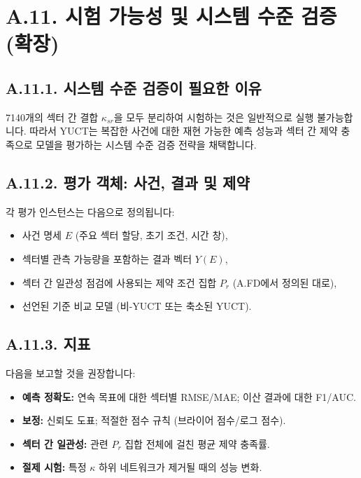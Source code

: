 \documentclass[13pt,a4paper]{article}
\begin{document}
	\section*{A.11. 시험 가능성 및 시스템 수준 검증 (확장)}
	\label{sec:extended-testability}
	
	\subsection*{A.11.1. 시스템 수준 검증이 필요한 이유}
	7140개의 섹터 간 결합 $\kappa_{sr}$을 모두 분리하여 시험하는 것은 일반적으로 실행 불가능합니다. 따라서 YUCT는 복잡한 사건에 대한 재현 가능한 예측 성능과 섹터 간 제약 충족으로 모델을 평가하는 시스템 수준 검증 전략을 채택합니다.
	
	\subsection*{A.11.2. 평가 객체: 사건, 결과 및 제약}
	각 평가 인스턴스는 다음으로 정의됩니다:
	\begin{itemize}[leftmargin=*]
		\item 사건 명세 $E$ (주요 섹터 할당, 초기 조건, 시간 창),
		\item 섹터별 관측 가능량을 포함하는 결과 벡터 $Y(E)$,
		\item 섹터 간 일관성 점검에 사용되는 제약 조건 집합 $P_r$ (A.FD에서 정의된 대로),
		\item 선언된 기준 비교 모델 (비-YUCT 또는 축소된 YUCT).
	\end{itemize}
	
	\subsection*{A.11.3. 지표}
	다음을 보고할 것을 권장합니다:
	\begin{itemize}[leftmargin=*]
		\item \textbf{예측 정확도:} 연속 목표에 대한 섹터별 RMSE/MAE; 이산 결과에 대한 F1/AUC.
		\item \textbf{보정:} 신뢰도 도표; 적절한 점수 규칙 (브라이어 점수/로그 점수).
		\item \textbf{섹터 간 일관성:} 관련 $P_r$ 집합 전체에 걸친 평균 제약 충족률.
		\item \textbf{절제 시험:} 특정 $\kappa$ 하위 네트워크가 제거될 때의 성능 변화.
	\end{itemize}
	
\end{document}
